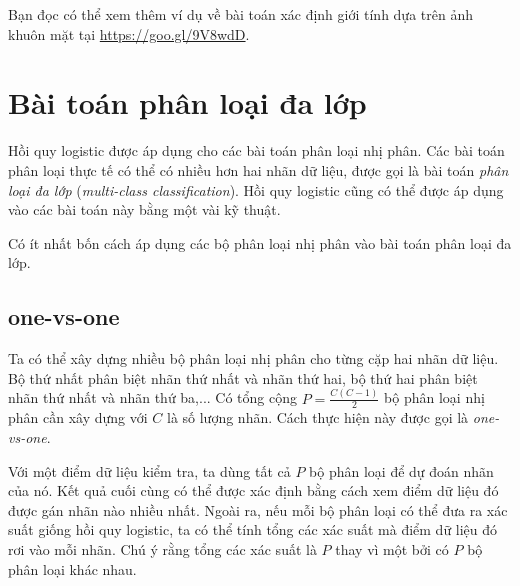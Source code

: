 Bạn đọc có thể xem thêm ví dụ về bài toán xác định giới tính dựa trên ảnh
khuôn mặt tại \url{https://goo.gl/9V8wdD}.

\section{Bài toán phân loại đa lớp}
\label{sec:biclassifier}
Hồi quy logistic được áp dụng cho các bài toán phân loại nhị phân. Các bài
toán phân loại thực tế có thể có nhiều hơn hai nhãn dữ liệu, được gọi
là bài toán \textit{phân loại đa lớp} (\textit{multi-class classification}). Hồi quy logistic cũng có thể được áp dụng vào các bài toán này bằng một vài kỹ thuật. 

 
Có {ít nhất} bốn cách áp dụng các bộ phân loại nhị phân vào bài toán phân
loại đa lớp.%

\subsection{one-vs-one} 

Ta có thể xây dựng nhiều bộ phân loại nhị phân cho từng cặp hai nhãn dữ liệu. Bộ
thứ nhất phân biệt nhãn thứ nhất và nhãn thứ hai, bộ thứ hai phân biệt nhãn thứ
nhất và nhãn thứ ba,... Có tổng cộng $P = \frac{C(C-1)}{2}$ bộ phân loại nhị phân
cần xây dựng với $C$ là số lượng nhãn. Cách thực hiện này được gọi là
\textit{one-vs-one}.

Với một điểm dữ liệu kiểm tra, ta dùng tất cả $P$ bộ phân loại để dự đoán nhãn của nó. Kết quả cuối cùng có thể được xác định bằng cách
xem điểm dữ liệu đó được gán nhãn nào nhiều nhất. Ngoài ra, nếu mỗi bộ phân loại có thể đưa ra xác suất giống hồi quy logistic, ta có thể tính {tổng các xác suất} mà điểm dữ liệu đó rơi vào mỗi nhãn. Chú ý rằng tổng các xác suất là $P$ thay vì một bởi có $P$ bộ phân loại khác nhau.


